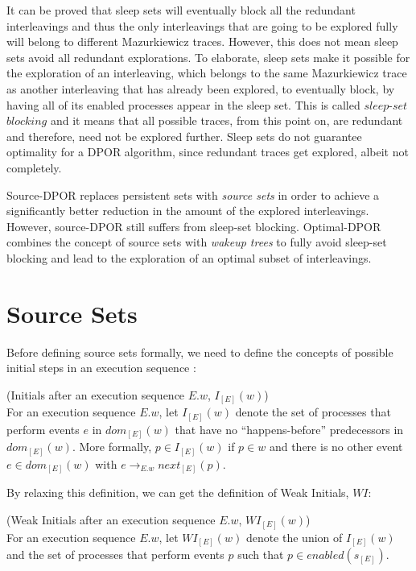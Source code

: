 It can be proved \cite{Godefroid1996} that sleep sets will eventually block all the redundant interleavings and thus 
the only interleavings that are going to be explored fully will belong to different Mazurkiewicz traces.
However, this does not mean sleep sets avoid all redundant explorations. To elaborate, sleep sets 
make it possible for the exploration of an interleaving, which belongs to the same Mazurkiewicz trace as another
interleaving that has already been explored, to eventually block, by having all of its enabled processes
appear in the sleep set. This is called $sleep$-$set$ $blocking$ and it means that all possible traces, from this point on,
are redundant and therefore, need not be explored further. Sleep sets do not guarantee optimality 
for a DPOR algorithm, since redundant traces get explored, albeit not completely.

Source-DPOR \cite{AbdullaAronisJohnssonSagonasDPOR2014} replaces persistent sets with \textit{source sets} in order to achieve a 
significantly better reduction in the amount of the explored interleavings. However, source-DPOR still suffers from sleep-set 
blocking. Optimal-DPOR \cite{AbdullaAronisJohnssonSagonasDPOR2014} 
combines the concept of source sets with \textit{wakeup trees} to fully avoid sleep-set blocking and lead to the exploration
of an optimal subset of interleavings.

\section{Source Sets}

Before defining source sets formally, we need to define the concepts 
of possible initial steps in an execution sequence \cite{AbdullaAronisJohnssonSagonasDPOR2014}:

\begin{definition}{(Initials after an execution sequence $E.w$, $I_{[E]}(w)$)}\\
For an execution sequence $E.w$, let $I_{[E]}(w)$ denote the set of
processes that perform events $e$ in $dom_{[E]}(w)$ that have no
“happens-before” predecessors in $dom_{[E]}(w)$. More formally,
$p \in I_{[E]}(w)$ if $p \in w$ and there is no other event $e \in dom_{[E]}(w)$ with
$e \rightarrow_{E.w} next_{[E]}(p)$.
\end{definition}

By relaxing this definition, we can get the definition of Weak Initials, $WI$:

\begin{definition}{(Weak Initials after an execution sequence $E.w$, $WI_{[E]}(w)$)}\\
For an execution sequence $E.w$, let $WI_{[E]}(w)$ denote the union of $I_{[E]}(w)$ and the set of
processes that perform events $p$ such that $p \in enabled(s_{[E]}) $.
\end{definition}

